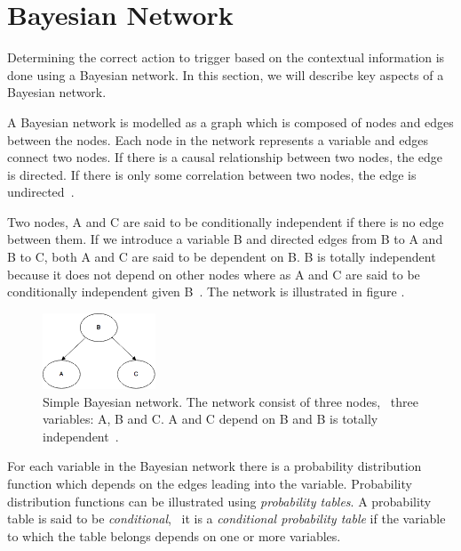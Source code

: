 \section{Bayesian Network}

Determining the correct action to trigger based on the contextual information is done using a Bayesian network. In this section, we will describe key aspects of a Bayesian network.

A Bayesian network is modelled as a graph which is composed of nodes and edges between the nodes. Each node in the network represents a variable and edges connect two nodes. If there is a causal relationship between two nodes, the edge is directed. If there is only some correlation between two nodes, the edge is undirected~\cite{stephenson2000introduction}.


Two nodes, A and C are said to be conditionally independent if there is no edge between them. If we introduce a variable B and directed edges from B to A and B to C, both A and C are said to be dependent on B. B is totally independent because it does not depend on other nodes where as A and C are said to be conditionally independent given B~\cite{stephenson2000introduction}. The network is illustrated in figure .

\begin{figure}[h!]
\centering
\includegraphics[width=0.3\textwidth]{images/a_b_c_bayesian_network}
\caption{Simple Bayesian network. The network consist of three nodes, \ie~three variables: A, B and C. A and C depend on B and B is totally independent~\cite{stephenson2000introduction}.}
\label{fig:analysis:bayesian-network:abc}
\end{figure}

For each variable in the Bayesian network there is a probability distribution function which depends on the edges leading into the variable. Probability distribution functions can be illustrated using \emph{probability tables}. A probability table is said to be \emph{conditional}, \ie~it is a \emph{conditional probability table} if the variable to which the table belongs depends on one or more variables.


